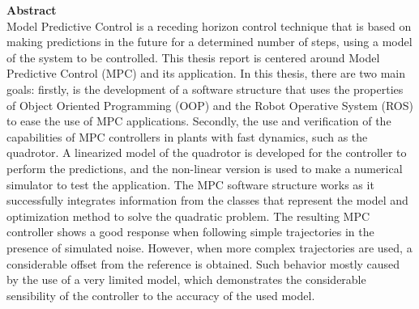 \justify
\textbf{Abstract}\\

Model Predictive Control is a receding horizon control technique that is based on making predictions in the future for a determined number of steps, using a model of the system to be controlled. This thesis report is centered around Model Predictive Control (MPC) and its application. In this thesis, there are two main goals: firstly, is the development of a software structure that uses the properties of Object Oriented Programming (OOP) and the Robot Operative System (ROS) to ease the use of MPC applications. Secondly, the use and verification of the capabilities of MPC controllers in plants with fast dynamics, such as the quadrotor. A linearized model of the quadrotor is developed for the controller to perform the predictions, and the non-linear version is used to make a numerical simulator to test the application. The MPC software structure works as it successfully integrates information from the classes that represent the model and optimization method to solve the quadratic problem. The resulting MPC controller shows a good response when following simple trajectories in the presence of simulated noise. However, when more complex trajectories are used, a considerable offset from the reference is obtained. Such behavior mostly caused by the use of a very limited model, which demonstrates the considerable sensibility of the controller to the accuracy of the used model.

